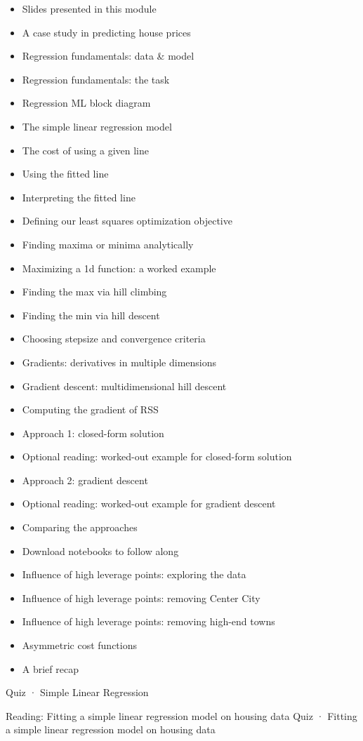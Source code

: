 \begin{itemize}
\item Slides presented in this module
\item A case study in predicting house prices
\item Regression fundamentals: data & model
\item Regression fundamentals: the task
\item Regression ML block diagram
\item The simple linear regression model
\item The cost of using a given line
\item Using the fitted line
\item Interpreting the fitted line
\item Defining our least squares optimization objective
\item Finding maxima or minima analytically
\item Maximizing a 1d function: a worked example
\item Finding the max via hill climbing
\item Finding the min via hill descent
\item Choosing stepsize and convergence criteria
\item Gradients: derivatives in multiple dimensions
\item Gradient descent: multidimensional hill descent
\item Computing the gradient of RSS
\item Approach 1: closed-form solution
\item Optional reading: worked-out example for closed-form solution
\item Approach 2: gradient descent
\item Optional reading: worked-out example for gradient descent
\item Comparing the approaches
\item Download notebooks to follow along
\item Influence of high leverage points: exploring the data
\item Influence of high leverage points: removing Center City
\item Influence of high leverage points: removing high-end towns
\item Asymmetric cost functions
\item A brief recap
\end{itemize}
Quiz · Simple Linear Regression
\item Reading: Fitting a simple linear regression model on housing data
Quiz · Fitting a simple linear regression model on housing data

